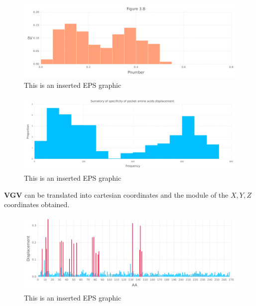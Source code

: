 \documentclass[10pt,letterpaper]{article}
\begin{document}
\begin{figure}[ht]
\begin{center}
\includegraphics[scale=0.5]{1m14/3bfigure_very_hi-precision.pdf}
\caption{This is an inserted EPS graphic}
\label{fig10}
\end{center}
\end{figure}

\begin{figure}[ht]
\begin{center}
\includegraphics[scale=0.5]{1m14/3bbfigure_very_hi-precision.pdf}
\caption{This is an inserted EPS graphic}
\label{fig11}
\end{center}
\end{figure}

\FloatBarrier


\textbf{VGV} can be translated into cartesian coordinates and the module of the \(X, Y, Z\) coordinates obtained.

\begin{figure}[ht]
\begin{center}
\includegraphics[scale=0.5]{1m14/5figure_very_hi-precision.pdf}
\caption{This is an inserted EPS graphic}
\label{fig13}
\end{center}
\end{figure}
\end{document}
